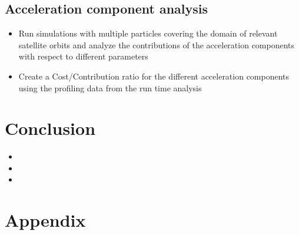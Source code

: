 \documentclass[11pt,
               a4paper,
               bibtotoc,
               idxtotoc,
               headsepline,
               footsepline,
               footexclude,
               BCOR12mm,
               DIV13,
               openany,   %
               ]
               {scrbook}
\begin{document}
\chapter{Acceleration component analysis}
    \begin{itemize}
        \item Run simulations with multiple particles covering the domain of relevant satellite orbits and analyze the contributions of the acceleration components with respect to different parameters
        \item Create a Cost/Contribution ratio for the different acceleration components using the profiling data from the run time analysis
    \end{itemize}

\part{Conclusion}
    \begin{itemize}
        \item
        \item
        \item
    \end{itemize}

\appendix
\part{Appendix}

\listoffigures

\listoftables



\end{document}
